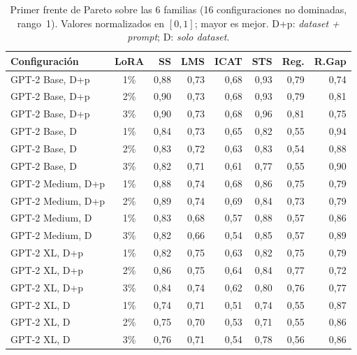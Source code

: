 \documentclass[12pt,a4paper]{report}
\begin{document}
\begin{table}[H]
\centering\footnotesize
\setlength{\tabcolsep}{4pt}
\caption{Primer frente de Pareto sobre las 6 familias (16 configuraciones no dominadas, rango~1). Valores normalizados en $[0,1]$; mayor es mejor. D+p: \textit{dataset + prompt}; D: \textit{solo dataset}.}
\label{tab:pareto_frente6}
\begin{tabularx}{\linewidth}{@{} L c r r r r r r @{}}
\toprule
\textbf{Configuración} & \textbf{LoRA} & \textbf{SS} & \textbf{LMS} & \textbf{ICAT} & \textbf{STS} & \textbf{Reg.} & \textbf{R.Gap} \\
\midrule
GPT-2 Base, D+p    & 1\% & 0{,}88 & 0{,}73 & 0{,}68 & 0{,}93 & 0{,}79 & 0{,}74 \\
GPT-2 Base, D+p    & 2\% & 0{,}90 & 0{,}73 & 0{,}68 & 0{,}93 & 0{,}79 & 0{,}81 \\
GPT-2 Base, D+p    & 3\% & 0{,}90 & 0{,}73 & 0{,}68 & 0{,}96 & 0{,}81 & 0{,}75 \\
GPT-2 Base, D      & 1\% & 0{,}84 & 0{,}73 & 0{,}65 & 0{,}82 & 0{,}55 & 0{,}94 \\
GPT-2 Base, D      & 2\% & 0{,}83 & 0{,}72 & 0{,}63 & 0{,}83 & 0{,}54 & 0{,}88 \\
GPT-2 Base, D      & 3\% & 0{,}82 & 0{,}71 & 0{,}61 & 0{,}77 & 0{,}55 & 0{,}90 \\
GPT-2 Medium, D+p  & 1\% & 0{,}88 & 0{,}74 & 0{,}68 & 0{,}86 & 0{,}75 & 0{,}79 \\
GPT-2 Medium, D+p  & 2\% & 0{,}89 & 0{,}74 & 0{,}69 & 0{,}84 & 0{,}73 & 0{,}79 \\
GPT-2 Medium, D    & 1\% & 0{,}83 & 0{,}68 & 0{,}57 & 0{,}88 & 0{,}57 & 0{,}86 \\
GPT-2 Medium, D    & 3\% & 0{,}82 & 0{,}66 & 0{,}54 & 0{,}85 & 0{,}57 & 0{,}89 \\
GPT-2 XL, D+p      & 1\% & 0{,}82 & 0{,}75 & 0{,}63 & 0{,}82 & 0{,}75 & 0{,}79 \\
GPT-2 XL, D+p      & 2\% & 0{,}86 & 0{,}75 & 0{,}64 & 0{,}84 & 0{,}77 & 0{,}72 \\
GPT-2 XL, D+p      & 3\% & 0{,}84 & 0{,}74 & 0{,}62 & 0{,}80 & 0{,}76 & 0{,}77 \\
GPT-2 XL, D        & 1\% & 0{,}74 & 0{,}71 & 0{,}51 & 0{,}74 & 0{,}55 & 0{,}87 \\
GPT-2 XL, D        & 2\% & 0{,}75 & 0{,}70 & 0{,}53 & 0{,}71 & 0{,}55 & 0{,}86 \\
GPT-2 XL, D        & 3\% & 0{,}76 & 0{,}71 & 0{,}54 & 0{,}78 & 0{,}56 & 0{,}86 \\
\bottomrule
\end{tabularx}
\end{table}
\end{document}
